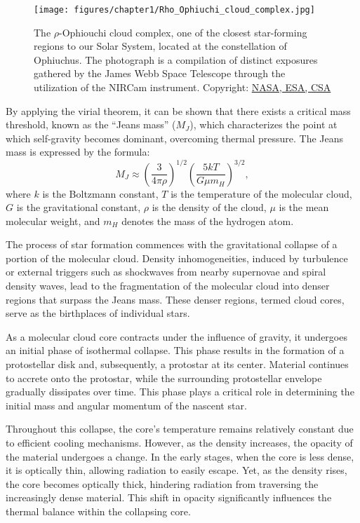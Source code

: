 \documentclass[main.tex]{subfiles}
\begin{document}
    \begin{figure}[t]
        \centering
        \texttt{[image: figures/chapter1/Rho\_Ophiuchi\_cloud\_complex.jpg]}
        \caption{The $\rho$-Ophiouchi cloud complex, one of the closest star-forming regions to our Solar System, located at the constellation of Ophiuchus. The photograph is a compilation of distinct exposures gathered by the James Webb Space Telescope through the utilization of the NIRCam instrument. Copyright: \href{https://www.esa.int/ESA_Multimedia/Images/2023/07/Rho_Ophiuchi_cloud_complex}{NASA, ESA, CSA}}
        \label{fig:rho_ophiouchi}
    \end{figure}

    By applying the virial theorem, it can be shown that there exists a critical mass threshold, known as the ``Jeans mass'' ($M_J$), which characterizes the point at which self-gravity becomes dominant, overcoming thermal pressure. The Jeans mass is expressed by the formula:
    \begin{equation}\label{eq:jeans_mass}
        M_J \approx \left(\frac{3}{4\pi \rho}\right)^{1/2} \left(\frac{5kT}{G\mu m_H }\right)^{3/2}, 
    \end{equation}
    where $k$ is the Boltzmann constant, $T$ is the temperature of the molecular cloud, $G$ is the gravitational constant, $\rho$ is the density of the cloud, $\mu$ is the mean molecular weight, and $m_H$ denotes the mass of the hydrogen atom.

    The process of star formation commences with the gravitational collapse of a portion of the molecular cloud. Density inhomogeneities, induced by turbulence or external triggers such as shockwaves from nearby supernovae and spiral density waves, lead to the fragmentation of the molecular cloud into denser regions that surpass the Jeans mass. These denser regions, termed cloud cores, serve as the birthplaces of individual stars.

    As a molecular cloud core contracts under the influence of gravity, it undergoes an initial phase of isothermal collapse. This phase results in the formation of a protostellar disk and, subsequently, a protostar at its center. Material continues to accrete onto the protostar, while the surrounding protostellar envelope gradually dissipates over time. This phase plays a critical role in determining the initial mass and angular momentum of the nascent star.
    
    Throughout this collapse, the core's temperature remains relatively constant due to efficient cooling mechanisms. However, as the density increases, the opacity of the material undergoes a change. In the early stages, when the core is less dense, it is optically thin, allowing radiation to easily escape. Yet, as the density rises, the core becomes optically thick, hindering radiation from traversing the increasingly dense material. This shift in opacity significantly influences the thermal balance within the collapsing core.
    
\end{document}
